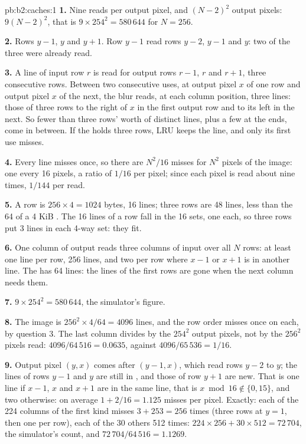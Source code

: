 \begin{solution}{pb:b2:caches:1}
\textbf{1.} Nine reads per output pixel, and $(N - 2)^2$ output pixels: $9(N - 2)^2$, that is
$9 \times 254^2 = 580\,644$ for $N = 256$.

\textbf{2.} Rows $y - 1$, $y$ and $y + 1$. Row $y - 1$ read rows $y - 2$, $y - 1$ and $y$: two of the three were
already read.

\textbf{3.} A line of input row $r$ is read for output rows $r - 1$, $r$ and $r + 1$, three consecutive rows. Between
two consecutive uses, at output pixel $x$ of one row and output pixel $x$ of the next, the blur reads, at each column
position, three lines: those of three rows to the right of $x$ in the first output row and to its left in the next.
So fewer than three rows' worth of distinct lines, plus a few at the ends, come in between. If the  holds three
rows, LRU keeps the line, and only its first use misses.

\textbf{4.} Every line misses once, so there are $N^2 / 16$ misses for $N^2$ pixels of the image: one every 16
pixels, a  ratio of $1/16$ per pixel; since each pixel is read about nine times, $1/144$ per read.

\textbf{5.} A row is $256 \times 4 = 1024$ bytes, 16 lines; three rows are 48 lines, less than the 64 of a 4 KiB
. The 16 lines of a row fall in the 16 sets, one each, so three rows put 3 lines in each 4-way set: they fit.

\textbf{6.} One column of output reads three columns of input over all $N$ rows: at least one line per row, 256
lines, and two per row where $x - 1$ or $x + 1$ is in another line. The  has 64 lines: the lines of the first
rows are gone when the next column needs them.

\textbf{7.} $9 \times 254^2 = 580\,644$, the simulator's figure.

\textbf{8.} The image is $256^2 \times 4 / 64 = 4096$ lines, and the row order misses once on each, by question 3.
The last column divides by the $254^2$ output pixels, not by the $256^2$ pixels read: $4096 / 64\,516 = 0.0635$,
against $4096 / 65\,536 = 1/16$.

\textbf{9.} Output pixel $(y, x)$ comes after $(y - 1, x)$, which read rows $y - 2$ to $y$; the lines of rows
$y - 1$ and $y$ are still in , and those of row $y + 1$ are new. That is one line if $x - 1$, $x$ and $x + 1$ are
in the same line, that is $x \bmod 16 \notin \{0, 15\}$, and two otherwise: on average $1 + 2/16 = 1.125$ misses per
pixel. Exactly: each of the 224 columns of the first kind misses $3 + 253 = 256$ times (three rows at $y = 1$, then
one per row), each of the 30 others 512 times: $224 \times 256 + 30 \times 512 = 72\,704$, the simulator's count, and
$72\,704 / 64\,516 = 1.1269$.


\end{solution}
